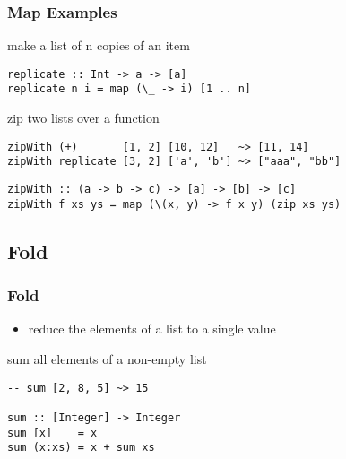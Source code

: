 \documentclass[dvipsnames]{beamer}
\theoremstyle{plain}
\begin{document}
\begin{frame}[fragile]
  \frametitle{Map Examples}

  \begin{exampleblock}{make a list of n copies of an item}
    \begin{lstlisting}[deletekeywords={replicate}]
replicate :: Int -> a -> [a]
replicate n i = map (\_ -> i) [1 .. n]
    \end{lstlisting}
  \end{exampleblock}

  \pause
  \begin{exampleblock}{zip two lists over a function}
    \begin{lstlisting}[frame=none]
zipWith (+)       [1, 2] [10, 12]   ~> [11, 14]
zipWith replicate [3, 2] ['a', 'b'] ~> ["aaa", "bb"]
    \end{lstlisting}

    \begin{lstlisting}[deletekeywords={zipWith}]
zipWith :: (a -> b -> c) -> [a] -> [b] -> [c]
zipWith f xs ys = map (\(x, y) -> f x y) (zip xs ys)
    \end{lstlisting}
  \end{exampleblock}
\end{frame}

\subsection{Fold}

\begin{frame}[fragile]
  \frametitle{Fold}

  \begin{itemize}
    \item reduce the elements of a list to a single value
  \end{itemize}

  \begin{exampleblock}{sum all elements of a non-empty list}
    \begin{lstlisting}[deletekeywords={sum}]
-- sum [2, 8, 5] ~> 15

sum :: [Integer] -> Integer
sum [x]    = x
sum (x:xs) = x + sum xs
    \end{lstlisting}
  \end{exampleblock}
\end{frame}
\end{document}
